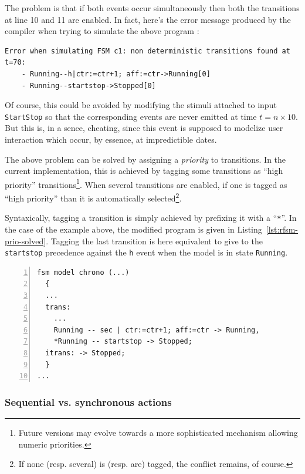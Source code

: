 The problem is that if both events occur simultaneously  then
both the transitions at line 10 and 11 are enabled. In fact, here's the error message produced by
the compiler when trying to simulate the above program :

\small
\begin{verbatim}
Error when simulating FSM c1: non deterministic transitions found at t=70:
	- Running--h|ctr:=ctr+1; aff:=ctr->Running[0]
	- Running--startstop->Stopped[0]
\end{verbatim}
\normalsize

Of course, this could be avoided by modifying the stimuli attached to input \verb|StartStop| so that the
corresponding events are never emitted at time $t=n\times 10$. But this is, in a sence, cheating,
since this event is supposed to modelize user interaction which occur, by essence, at impredictible
dates. 

The above problem can be solved by assigning a \emph{priority} to transitions. In the current
implementation, this is achieved by tagging some transitions as ``high priority''
transitions\footnote{Future versions may evolve towards a more sophisticated mechanism allowing
  numeric priorities.}.  When several transitions are enabled, if one is tagged as ``high priority''
than it is automatically selected\footnote{If none (resp. several) is (resp. are) tagged, the
  conflict remains, of course.}. 

Syntaxically, tagging a transition is simply achieved by prefixing it with a ``\verb|*|''. In the
case of the example above, the modified program is given in
Listing~\ref{lst:rfsm-prio-solved}. Tagging the last transition is here equivalent to give to the
\verb|startstop| precedence against the \verb|h| event when the model is in state
\verb|Running|.

\begin{lstlisting}[language=Rfsm,frame=single,numbers=left,caption=A rewriting of the model defined
  in Listing~\ref{lst:rfsm-prio-pb}, label={lst:rfsm-prio-solved},float]
fsm model chrono (...)
  {
  ...
  trans:
    ...
    Running -- sec | ctr:=ctr+1; aff:=ctr -> Running,
    *Running -- startstop -> Stopped;
  itrans: -> Stopped;
  }
...
\end{lstlisting}

\subsubsection{Sequential vs. synchronous actions}
\label{sec:sequ-vs.-synchr}

